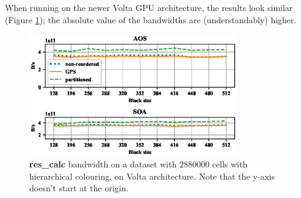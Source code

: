 
When running on the newer Volta GPU architecture, the results look similar
(Figure \ref{fig:airfoil_bw-vs-bs_hier_large_volta}); the absolute value of the
bandwidths are (understandably) higher.

\begin{figure}[Htbp]
  \centering
  \includegraphics[width=9cm]{fig/airfoil_bw-vs-bs_hier_large_volta.eps}
  \caption{\textbf{res\_calc} bandwidth on a dataset with $2880000$ cells with
  hierarchical colouring, on Volta architecture. Note that the y-axis doesn't
  start at the origin.}
  \label{fig:airfoil_bw-vs-bs_hier_large_volta}
\end{figure}

